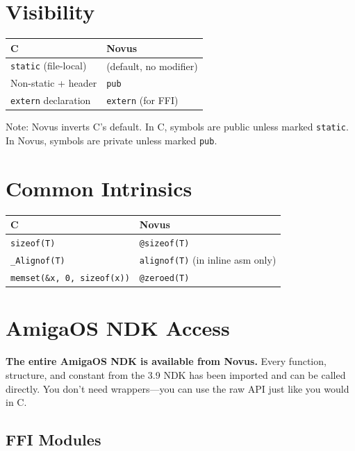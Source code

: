 \section{Visibility}

\begin{center}
\begin{tabular}{ll}
\textbf{C} & \textbf{Novus} \\
\hline
\texttt{static} (file-local) & (default, no modifier) \\
Non-static + header & \texttt{pub} \\
\texttt{extern} declaration & \texttt{extern} (for FFI) \\
\end{tabular}
\end{center}

Note: Novus inverts C's default. In C, symbols are public unless marked \texttt{static}. In Novus, symbols are private unless marked \texttt{pub}.

\section{Common Intrinsics}

\begin{center}
\begin{tabular}{ll}
\textbf{C} & \textbf{Novus} \\
\hline
\texttt{sizeof(T)} & \texttt{@sizeof(T)} \\
\texttt{\_Alignof(T)} & \texttt{alignof(T)} (in inline asm only) \\
\texttt{memset(\&x, 0, sizeof(x))} & \texttt{@zeroed(T)} \\
\end{tabular}
\end{center}

\section{AmigaOS NDK Access}

\textbf{The entire AmigaOS NDK is available from Novus.} Every function, structure, and constant from the 3.9 NDK has been imported and can be called directly. You don't need wrappers---you can use the raw API just like you would in C.

\subsection{FFI Modules}

